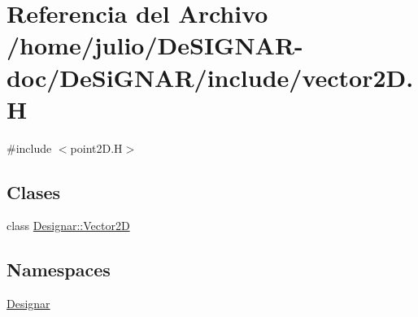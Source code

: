 \hypertarget{vector2_d_8_h}{}\section{Referencia del Archivo /home/julio/\+De\+S\+I\+G\+N\+A\+R-\/doc/\+De\+Si\+G\+N\+A\+R/include/vector2D.H}
\label{vector2_d_8_h}
{\ttfamily \#include $<$point2\+D.\+H$>$}\newline
\subsection*{Clases}
\begin{DoxyCompactItemize}
\item 
class \hyperlink{class_designar_1_1_vector2_d}{Designar\+::\+Vector2D}
\end{DoxyCompactItemize}
\subsection*{Namespaces}
\begin{DoxyCompactItemize}
\item 
 \hyperlink{namespace_designar}{Designar}
\end{DoxyCompactItemize}

